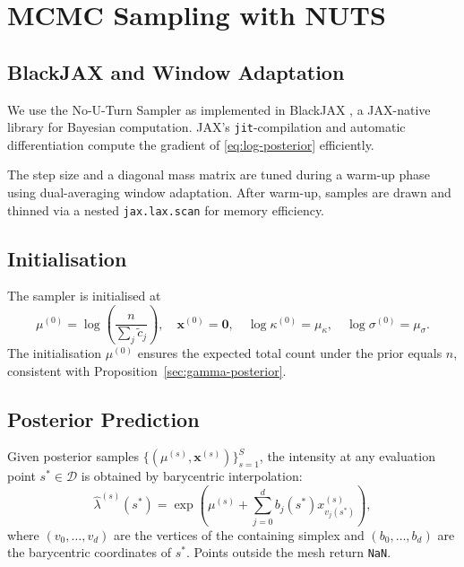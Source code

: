 \documentclass[11pt]{article}
\newcommand{\bx}{\mathbf{x}}
\begin{document}
\section{MCMC Sampling with NUTS}

\subsection{BlackJAX and Window Adaptation}

We use the No-U-Turn Sampler \citep{hoffman2014nuts} as implemented in
BlackJAX \citep{blackjax2024}, a JAX-native library for Bayesian computation.
JAX's \texttt{jit}-compilation and automatic differentiation compute the
gradient of \eqref{eq:log-posterior} efficiently.

The step size and a diagonal mass matrix are tuned during a warm-up phase using
dual-averaging window adaptation.  After warm-up, samples are drawn and thinned
via a nested \texttt{jax.lax.scan} for memory efficiency.

\subsection{Initialisation}

The sampler is initialised at
\begin{equation}
  \mu^{(0)} = \log\!\left(\frac{n}{\sum_j \tilde{c}_j}\right),
  \quad \bx^{(0)} = \mathbf{0},
  \quad \log\kappa^{(0)} = \mu_\kappa,
  \quad \log\sigma^{(0)} = \mu_\sigma.
  \label{eq:init}
\end{equation}
The initialisation $\mu^{(0)}$ ensures the expected total count under the
prior equals $n$, consistent with Proposition~\ref{sec:gamma-posterior}.

\subsection{Posterior Prediction}

Given posterior samples $\{(\mu^{(s)}, \bx^{(s)})\}_{s=1}^S$, the intensity
at any evaluation point $s^* \in \mathcal{D}$ is obtained by barycentric
interpolation:
\begin{equation}
  \hat\lambda^{(s)}(s^*) = \exp\!\left(\mu^{(s)} + \sum_{j=0}^d b_j(s^*) x^{(s)}_{v_j(s^*)}\right),
\end{equation}
where $(v_0, \ldots, v_d)$ are the vertices of the containing simplex and
$(b_0, \ldots, b_d)$ are the barycentric coordinates of $s^*$.
Points outside the mesh return \texttt{NaN}.
\end{document}
